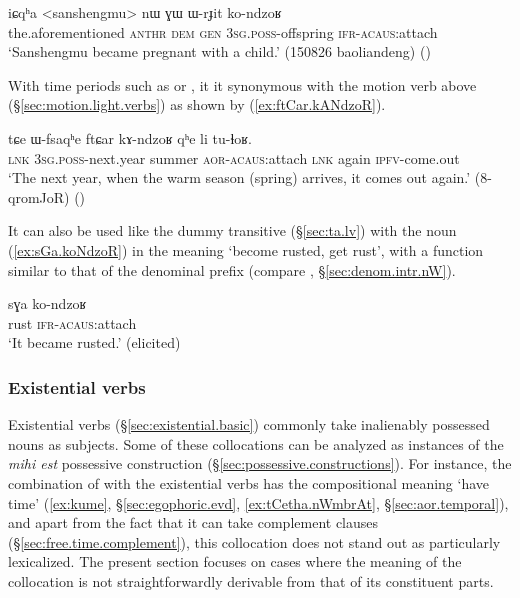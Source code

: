  \begin{exe}
\ex \label{ex:WrJit.konzdoR}
\gll iɕqʰa <sanshengmu> nɯ ɣɯ ɯ-rɟit ko-ndzoʁ \\
the.aforementioned  \textsc{anthr} \textsc{dem} \textsc{gen} \textsc{3sg}.\textsc{poss}-offspring \textsc{ifr}-\textsc{acaus}:attach \\
\glt `Sanshengmu became pregnant with a child.' (150826 baoliandeng)
()
 \end{exe} 
  
With time periods such as  or , it it synonymous with the motion verb  above (§\ref{sec:motion.light.verbs}) as shown by (\ref{ex:ftCar.kANdzoR}).
  
\begin{exe}
\ex \label{ex:ftCar.kANdzoR}
\gll  tɕe ɯ-fsaqʰe ftɕar kɤ-ndzoʁ qʰe li tu-ɬoʁ. \\
\textsc{lnk} \textsc{3sg}.\textsc{poss}-next.year summer \textsc{aor}-\textsc{acaus}:attach \textsc{lnk} again \textsc{ipfv}-come.out \\
\glt  `The next year, when the warm season (spring) arrives, it comes out again.' (8-qromJoR)
()
 \end{exe}  

It can also be used like the dummy transitive  (§\ref{sec:ta.lv}) with the noun  (\ref{ex:sGa.koNdzoR}) in the meaning `become rusted, get rust', with a function similar to that of the  denominal prefix (compare , §\ref{sec:denom.intr.nW}).

\begin{exe}
\ex \label{ex:sGa.koNdzoR}
\gll sɣa ko-ndzoʁ \\
rust \textsc{ifr}-\textsc{acaus}:attach  \\
\glt `It became rusted.' (elicited)
\end{exe}  

 
\subsubsection{Existential verbs} \label{sec:existential.light.verbs}
Existential verbs (§\ref{sec:existential.basic}) commonly take inalienably possessed nouns as subjects. Some of these collocations can be analyzed as instances of the \textit{mihi est} possessive construction (§\ref{sec:possessive.constructions}). For instance, the combination of  with the existential verbs has the compositional meaning `have time' (\ref{ex:kume}, §\ref{sec:egophoric.evd}, \ref{ex:tCetha.nWmbrAt}, §\ref{sec:aor.temporal}), and apart from the fact that it can take complement clauses (§\ref{sec:free.time.complement}), this collocation does not stand out as particularly lexicalized. The present section focuses on cases where the meaning of the collocation is not straightforwardly derivable from that of its constituent parts.


